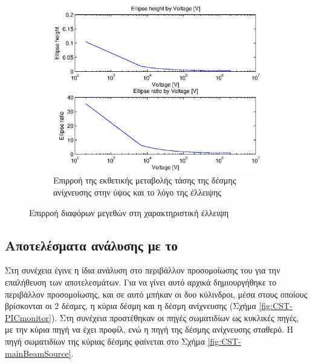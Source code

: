 \begin{figure}[tph]
\begin{subfigure}{0.45\textwidth}
		\label{fig:beam-deflection-script-06}
	\end{subfigure}
	\par\bigskip
	\begin{subfigure}{0.45\textwidth}
		\includegraphics[width=0.9\linewidth]{figures/beam-deflection-script-07}
		\centering
		\caption{Επιρροή της εκθετικής μεταβολής τάσης της δέσμης ανίχνευσης στην ύψος και το λόγο της έλλειψης}
		\label{fig:beam-deflection-script-07}
	\end{subfigure}
\caption{Επιρροή διαφόρων μεγεθών στη χαρακτηριστική έλλειψη}
\label{fig:beam-deflectoin}
\end{figure}

\subsection{Αποτελέσματα ανάλυσης με το }

Στη συνέχεια έγινε η ίδια ανάλυση στο περιβάλλον προσομοίωσης του  για την επαλήθευση των αποτελεσμάτων. 
Για να γίνει αυτό αρχικά δημιουργήθηκε το περιβάλλον προσομοίωσης, και σε αυτό μπήκαν οι  δυο κύλινδροι, μέσα στους οποίους βρίσκονται οι 2 δέσμες, η κύρια δέσμη και η δέσμη ανίχνευσης (Σχήμα \ref{fig:CST-PICmonitor}). 
Στη συνέχεια προστέθηκαν οι πηγές σωματιδίων ως κυκλικές πηγές, με την κύρια πηγή να έχει  προφίλ, ενώ η πηγή της δέσμης ανίχνευσης σταθερό. 
Η πηγή σωματιδίων της κύριας δέσμης φαίνεται στο Σχήμα \ref{fig:CST-mainBeamSource}.

